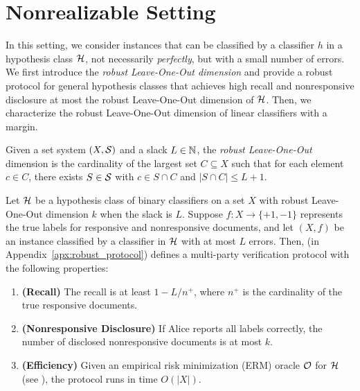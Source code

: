 \section{Nonrealizable Setting}
\label{sec:non_realizable}

In this setting, we consider instances that can be classified by a classifier $h$ in a hypothesis class $\mathcal{H}$, not necessarily \emph{perfectly}, but with a small number of errors.
We first introduce the \emph{robust Leave-One-Out dimension} and provide a robust protocol for general hypothesis classes that achieves high recall and nonresponsive disclosure at most the robust Leave-One-Out dimension of $\mathcal{H}$.
Then, we characterize the robust Leave-One-Out dimension of linear classifiers with a margin. 

\begin{definition}
\label{defn:robust_leave_one_out}
     Given a set system $(X,\mathcal{S})$ and a slack $L \in \mathbb{N}$, the \emph{robust Leave-One-Out} dimension is the cardinality of the largest set $C\subseteq X$ such that for each element $c \in C$, there exists $S \in \mathcal{S}$ with $c \in S \cap C$ and $|S\cap C| \leq L+1$.
\end{definition}

\begin{theorem}\label{thm:robust_protocol_general}
    Let $\mathcal{H}$ be a hypothesis class of binary classifiers on a set $X$ with robust Leave-One-Out dimension $k$ when the slack is $L$.  
    Suppose $f: X \to \{+1,-1\}$ represents the true labels for responsive and nonresponsive documents, and let $(X,f)$ be an instance classified by a classifier in $\mathcal{H}$ with at most $L$ errors. Then,  (in Appendix~\ref{apx:robust_protocol}) defines a multi-party verification protocol with the following properties:
    \begin{enumerate}
        \item \textbf{(Recall)} The recall is at least $1-L/n^+$, where $n^+$ is the cardinality of the true responsive documents.
        \item \textbf{(Nonresponsive Disclosure)} If Alice reports all labels correctly, the number of disclosed nonresponsive documents is at most $k$.
        \item \textbf{(Efficiency)} Given an empirical risk minimization (ERM) oracle $\mathcal{O}$ for $\mathcal{H}$ (see ), the protocol runs in time $O(|X|)$.
    \end{enumerate}
\end{theorem}

